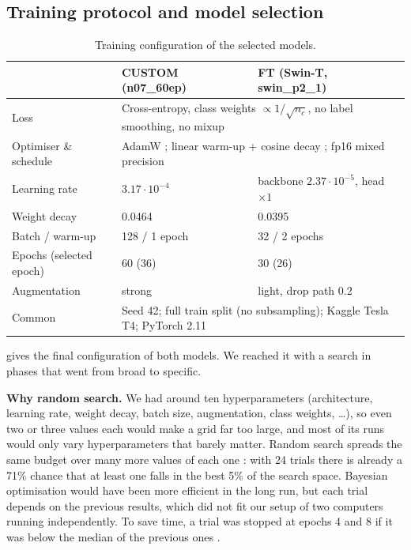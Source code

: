 \subsection{Training protocol and model selection}\label{sec:protocol}
\begin{table}[H]
\centering\scriptsize
\setlength{\tabcolsep}{4pt}
\caption{Training configuration of the selected models.}\label{tab:config}
\begin{tabular}{@{}l l l@{}}
\toprule
 & CUSTOM (n07\_60ep) & FT (Swin-T, swin\_p2\_1) \\
\midrule
Loss & \multicolumn{2}{l}{Cross-entropy, class weights $\propto 1/\sqrt{n_c}$, no label smoothing, no mixup} \\
Optimiser \& schedule & \multicolumn{2}{l}{AdamW \citep{loshchilov2019adamw}; linear warm-up + cosine decay \citep{loshchilov2017sgdr}; fp16 mixed precision} \\
Learning rate & $3.17\cdot10^{-4}$ & backbone $2.37\cdot10^{-5}$, head $\times1$ \\
Weight decay & 0.0464 & 0.0395 \\
Batch / warm-up & 128 / 1 epoch & 32 / 2 epochs \\
Epochs (selected epoch) & 60 (36) & 30 (26) \\
Augmentation & strong & light, drop path 0.2 \\
\midrule
Common & \multicolumn{2}{l}{Seed 42; full train split (no subsampling); Kaggle Tesla T4; PyTorch 2.11 \citep{paszke2019pytorch}} \\
\bottomrule
\end{tabular}
\end{table}

 gives the final configuration of both models. We reached it with a search in phases that went from broad to specific.

\textbf{Why random search.} We had around ten hyperparameters (architecture, learning rate, weight decay, batch size, augmentation, class weights, \dots), so even two or three values each would make a grid far too large, and most of its runs would only vary hyperparameters that barely matter. Random search spreads the same budget over many more values of each one \citep{bergstra2012random}: with 24 trials there is already a 71\% chance that at least one falls in the best 5\% of the search space. Bayesian optimisation would have been more efficient in the long run, but each trial depends on the previous results, which did not fit our setup of two computers running independently. To save time, a trial was stopped at epochs 4 and 8 if it was below the median of the previous ones \citep{golovin2017vizier}.

